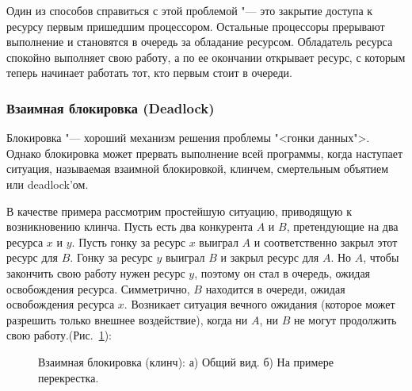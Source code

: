 \documentclass{article}
\begin{document}
				Один из способов справиться с этой проблемой "--- это закрытие доступа к ресурсу первым пришедшим процессором. 					Остальные процессоры прерывают выполнение и становятся в очередь за обладание ресурсом. Обладатель ресурса спокойно 				выполняет свою работу, а по ее окончании открывает ресурс, с которым теперь начинает работать тот, кто первым стоит в 			очереди.

				
			\subsubsection{Взаимная блокировка (Deadlock)}
				Блокировка "--- хороший механизм решения проблемы "<гонки данных">. Однако блокировка может прервать выполнение 				всей программы, когда наступает ситуация, называемая взаимной блокировкой, клинчем, смертельным объятием или 						deadlock'ом.
				
				В качестве примера рассмотрим простейшую ситуацию, приводящую к возникновению клинча. Пусть есть два конкурента 				$A$ и $B$, претендующие на два ресурса $x$ и $y$. Пусть гонку за ресурс $x$ выиграл $A$ и соответственно закрыл этот 				ресурс для $B$. Гонку за ресурс $y$ выиграл $B$ и закрыл ресурс для $A$. Но $A$, чтобы закончить свою работу нужен 					ресурс $y$, поэтому он стал в очередь, ожидая освобождения ресурса. Симметрично, $B$ находится в очереди, ожидая 					освобождения ресурса $x$. Возникает ситуация вечного ожидания (которое может разрешить только внешнее воздействие), 				когда ни $A$, ни $B$ не могут продолжить свою работу.(Рис.~\ref{ris:deadlock}):
			
			\begin{figure}[h!]
				\caption{Взаимная блокировка (клинч): а) Общий вид. б) На примере перекрестка.}
				\label{ris:deadlock}
			\end{figure}
	\newpage
\end{document}
